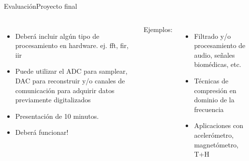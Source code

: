  \begin{frame}{Evaluación}{Proyecto final}
    \protoboardicon
    \begin{columns}[onlytextwidth]
       \begin{itemize}
          \item Deberá incluir algún tipo de procesamiento en hardware. ej. fft, fir, iir
          \item Puede utilizar el ADC para samplear, DAC para reconstruir y/o canales de comunicación para adquirir datos previamente digitalizados
          \item Presentación de 10 minutos.
          \item Deberá funcionar!
       \end{itemize}
       Ejemplos:
       \begin{itemize}
          \item Filtrado y/o procesamiento de audio, señales biomédicas, etc.
          \item Técnicas de compresión en dominio de la frecuencia
          \item Aplicaciones con acelerómetro, magnetómetro, T+H
       \end{itemize}
    \end{columns}
    \vfill
 \end{frame}
